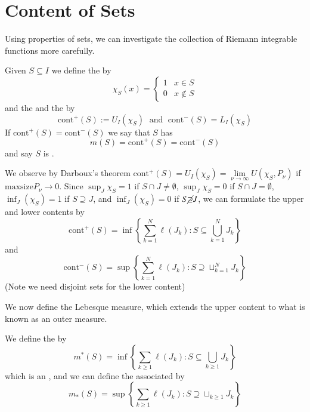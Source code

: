 \section{Content of Sets}

Using properties of sets, we can investigate the collection of Riemann integrable functions more carefully.

\begin{defn}
    Given $S \subseteq I$ we define the  by \begin{equation*}
        \chi_S(x) = \left\{\begin{array}{cc} 1 & x \in S \\ 0 & x \notin S \end{array}\right.
    \end{equation*}
    and the  and the  by \begin{equation*}
        \text{cont}^+(S) := U_I(\chi_S)\;\text{ and }\;\text{cont}^-(S) = L_I(\chi_S)
    \end{equation*}
    If $\text{cont}^+(S) = \text{cont}^-(S)$ we say that $S$ has  $$m(S) = \text{cont}^+(S) = \text{cont}^-(S)$$ and say $S$ is .
\end{defn}

We observe by Darboux's theorem $\text{cont}^+(S) = U_I(\chi_S) = \lim\limits_{\nu\rightarrow \infty}U(\chi_S,P_{\nu})$ if $\text{maxsize}P_{\nu}\rightarrow 0$. Since $\sup_{J}\chi_S = 1$ if $S \cap J \neq \emptyset$, $\sup_{J}\chi_S = 0$ if $S\cap J = \emptyset$, $\inf_J(\chi_S) = 1$ if $S \supseteq J$, and $\inf_J(\chi_S) = 0$ if $S \cancel{\supseteq} J$, we can formulate the upper and lower contents by $$\text{cont}^+(S) = \inf\left\{\sum_{k=1}^N\ell(J_k):S \subseteq \bigcup_{k=1}^NJ_k\right\}$$ and $$\text{cont}^-(S) = \sup\left\{\sum_{k=1}^N\ell(J_k):S \supseteq \sqcup_{k=1}^NJ_k\right\}$$ (Note we need disjoint sets for the lower content)

We now define the Lebesque measure, which extends the upper content to what is known as an outer measure.


\begin{defn}
    We define the  by $$m^*(S) = \inf\left\{\sum_{k\geq 1}\ell(J_k): S\subseteq \bigcup_{k\geq 1}J_k\right\}$$ which is an , and we can define the associated  by $$m_*(S) = \sup\left\{\sum_{k\geq 1}\ell(J_k):S\supseteq \sqcup_{k\geq 1}J_k\right\}$$
\end{defn}

